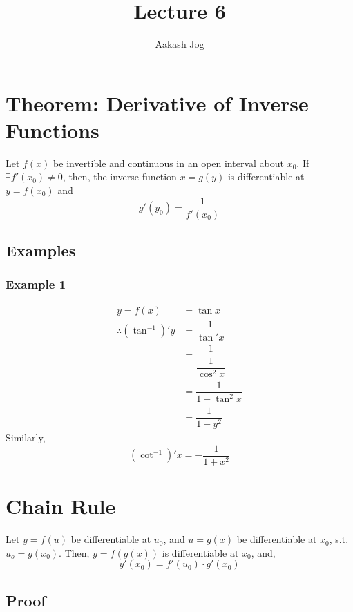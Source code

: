 \documentclass[fleqn]{article}
\title{Lecture 6}
\author{Aakash Jog}
\date{\formatdate{13}{11}{2014}}
\begin{document}
	
\maketitle

\tableofcontents

\newpage
\section{Theorem: Derivative of Inverse Functions}

Let $f(x)$ be invertible and continuous in an open interval about $x_0$. If $\exists f'(x_0) \neq 0$, then, the inverse function $x = g(y)$ is differentiable at $y = f(x_0)$ and
\begin{equation*}
	g'(y_0) = \dfrac{1}{f'(x_0)}
\end{equation*}

\subsection{Examples}

\subsubsection{Example 1}

\begin{align*}
	y = f(x) &= \tan x \\
	\therefore (\tan^{-1})' y &= \dfrac{1}{\tan' x} \\
	&= \dfrac{1}{\dfrac{1}{\cos^2 x}} \\
	&= \dfrac{1}{1 + \tan^2 x} \\
	&= \dfrac{1}{1 + y^2}
\end{align*}
Similarly,
\begin{equation*}
	(\cot^{-1})' x = - \dfrac{1}{1 + x^2} 
\end{equation*}

\section{Chain Rule}

Let $y = f(u)$ be differentiable at $u_0$, and $u = g(x)$ be differentiable at $x_0$, s.t. $u_o = g(x_0)$. Then, $y = f(g(x))$ is differentiable at $x_0$, and, 
\begin{equation*}
	y'(x_0) = f'(u_0) \cdot g'(x_0)
\end{equation*}

\subsection{Proof}
\end{document}
